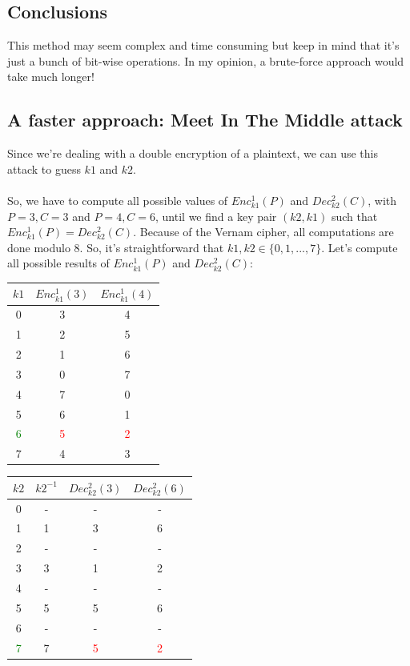 \documentclass[11pt, a4paper]{article}
\begin{document}
\subsection{Conclusions}
This method may seem complex and time consuming but keep in mind that it's just a bunch of bit-wise operations. In my opinion, a brute-force approach would take much longer!

\hypertarget{link1}{\subsection{A faster approach: Meet In The Middle attack}}
Since we're dealing with a double encryption of a plaintext, we can use this attack to guess $k1$ and $k2$.\\\\
So, we have to compute all possible values of $Enc^1_{k1}(P)$ and $Dec^2_{k2}(C)$, with $P=3,C=3$ and $P=4,C=6$, until we find a key pair $(k2,k1)$ such that $Enc^1_{k1}(P)=Dec^2_{k2}(C)$. Because of the Vernam cipher, all computations are done modulo 8. So, it's straightforward that $k1,k2\in\{0,1,...,7\}$. Let's compute all possible results of $Enc^1_{k1}(P)$ and $Dec^2_{k2}(C)$:
\begin{center}
    \begin{tabular}{|c|c|c|}
        \hline
        $k1$&$Enc^1_{k1}(3)$&$Enc^1_{k1}(4)$\\
        \hline
        0&3&4\\
        1&2&5\\
        2&1&6\\
        3&0&7\\
        4&7&0\\
        5&6&1\\
        \textcolor{Green}{6}&\textcolor{red}{5}&\textcolor{red}{2}\\
        7&4&3\\
        \hline
    \end{tabular}\qquad
    \begin{tabular}{|c|c|c|c|}
        \hline
        $k2$&$k2^{-1}$&$Dec^2_{k2}(3)$&$Dec^2_{k2}(6)$\\
        \hline
        0&-&-&-\\
        1&1&3&6\\
        2&-&-&-\\
        3&3&1&2\\
        4&-&-&-\\
        5&5&5&6\\
        6&-&-&-\\
        \textcolor{Green}{7}&7&\textcolor{red}{5}&\textcolor{red}{2}\\
        \hline
    \end{tabular}
\end{center}
\end{document}
